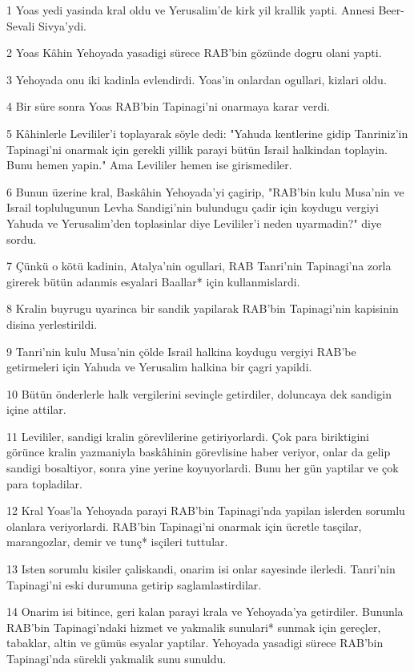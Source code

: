 \par 1 Yoas yedi yasinda kral oldu ve Yerusalim'de kirk yil krallik yapti. Annesi Beer-Sevali Sivya'ydi.
\par 2 Yoas Kâhin Yehoyada yasadigi sürece RAB'bin gözünde dogru olani yapti.
\par 3 Yehoyada onu iki kadinla evlendirdi. Yoas'in onlardan ogullari, kizlari oldu.
\par 4 Bir süre sonra Yoas RAB'bin Tapinagi'ni onarmaya karar verdi.
\par 5 Kâhinlerle Levililer'i toplayarak söyle dedi: "Yahuda kentlerine gidip Tanriniz'in Tapinagi'ni onarmak için gerekli yillik parayi bütün Israil halkindan toplayin. Bunu hemen yapin." Ama Levililer hemen ise girismediler.
\par 6 Bunun üzerine kral, Baskâhin Yehoyada'yi çagirip, "RAB'bin kulu Musa'nin ve Israil toplulugunun Levha Sandigi'nin bulundugu çadir için koydugu vergiyi Yahuda ve Yerusalim'den toplasinlar diye Levililer'i neden uyarmadin?" diye sordu.
\par 7 Çünkü o kötü kadinin, Atalya'nin ogullari, RAB Tanri'nin Tapinagi'na zorla girerek bütün adanmis esyalari Baallar* için kullanmislardi.
\par 8 Kralin buyrugu uyarinca bir sandik yapilarak RAB'bin Tapinagi'nin kapisinin disina yerlestirildi.
\par 9 Tanri'nin kulu Musa'nin çölde Israil halkina koydugu vergiyi RAB'be getirmeleri için Yahuda ve Yerusalim halkina bir çagri yapildi.
\par 10 Bütün önderlerle halk vergilerini sevinçle getirdiler, doluncaya dek sandigin içine attilar.
\par 11 Levililer, sandigi kralin görevlilerine getiriyorlardi. Çok para biriktigini görünce kralin yazmaniyla baskâhinin görevlisine haber veriyor, onlar da gelip sandigi bosaltiyor, sonra yine yerine koyuyorlardi. Bunu her gün yaptilar ve çok para topladilar.
\par 12 Kral Yoas'la Yehoyada parayi RAB'bin Tapinagi'nda yapilan islerden sorumlu olanlara veriyorlardi. RAB'bin Tapinagi'ni onarmak için ücretle tasçilar, marangozlar, demir ve tunç* isçileri tuttular.
\par 13 Isten sorumlu kisiler çaliskandi, onarim isi onlar sayesinde ilerledi. Tanri'nin Tapinagi'ni eski durumuna getirip saglamlastirdilar.
\par 14 Onarim isi bitince, geri kalan parayi krala ve Yehoyada'ya getirdiler. Bununla RAB'bin Tapinagi'ndaki hizmet ve yakmalik sunulari* sunmak için gereçler, tabaklar, altin ve gümüs esyalar yaptilar. Yehoyada yasadigi sürece RAB'bin Tapinagi'nda sürekli yakmalik sunu sunuldu.
